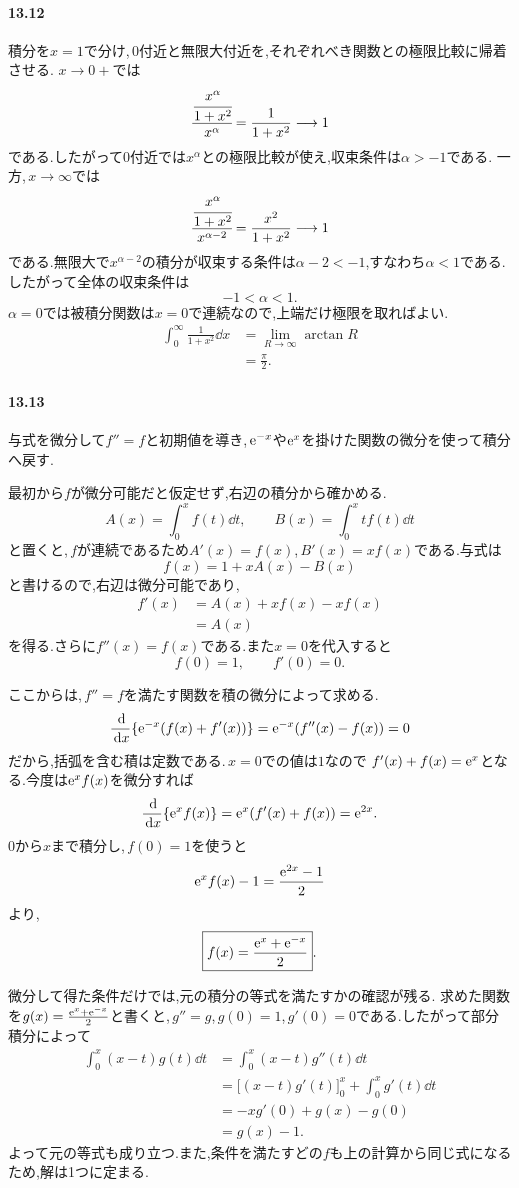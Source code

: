 \paragraph{13.12}
積分を$x=1$で分け,\,$0$付近と無限大付近を,それぞれべき関数との極限比較に帰着させる.
$x\to0+$では
\[
 \cfrac{\cfrac{x^\alpha}{1+x^2}}{x^\alpha}
 =\frac1{1+x^2}\longrightarrow1
\]
である.したがって$0$付近では$x^\alpha$との極限比較が使え,収束条件は$\alpha>-1$である.
一方,\,$x\to\infty$では
\[
 \cfrac{\cfrac{x^\alpha}{1+x^2}}{x^{\alpha-2}}
 =\frac{x^2}{1+x^2}\longrightarrow1
\]
である.無限大で$x^{\alpha-2}$の積分が収束する条件は$\alpha-2<-1$,すなわち$\alpha<1$である.
したがって全体の収束条件は
\[
 \boxed{-1<\alpha<1}.
\]
$\alpha=0$では被積分関数は$x=0$で連続なので,上端だけ極限を取ればよい.
\[
 \begin{aligned}
 \int_0^{\infty}\frac1{1+x^2}\dd x
 &=\lim_{R\to\infty}\arctan R\\
 &=\boxed{\frac{\pi}{2}}.
 \end{aligned}
\]

\paragraph{13.13}
与式を微分して$f''=f$と初期値を導き,\,$\mathrm{e}^{-x}$や$\mathrm{e}^x$を掛けた関数の微分を使って積分へ戻す.

最初から$f$が微分可能だと仮定せず,右辺の積分から確かめる.
\[
 A(x)=\int_0^xf(t)\dd t,\qquad
 B(x)=\int_0^xtf(t)\dd t
\]
と置くと,\,$f$が連続であるため$A'(x)=f(x)$,\,$B'(x)=xf(x)$である.与式は
\[
 f(x)=1+xA(x)-B(x)
\]
と書けるので,右辺は微分可能であり,
\[
 \begin{aligned}
 f'(x)&=A(x)+xf(x)-xf(x)\\
 &=A(x)
 \end{aligned}
\]
を得る.さらに$f''(x)=f(x)$である.また$x=0$を代入すると
\[
 f(0)=1,\qquad f'(0)=0.
\]

ここからは,\,$f''=f$を満たす関数を積の微分によって求める.
\[
 \frac{\,\mathrm{d}}{\,\mathrm{d} x}\{\mathrm{e}^{-x}(f(x)+f'(x))\}
 =\mathrm{e}^{-x}(f''(x)-f(x))=0
\]
だから,括弧を含む積は定数である.\,$x=0$での値は$1$なので
$f'(x)+f(x)=\mathrm{e}^x$となる.今度は$\mathrm{e}^xf(x)$を微分すれば
\[
 \frac{\,\mathrm{d}}{\,\mathrm{d} x}\{\mathrm{e}^xf(x)\}=\mathrm{e}^x(f'(x)+f(x))=\mathrm{e}^{2x}.
\]
$0$から$x$まで積分し,\,$f(0)=1$を使うと
\[
 \mathrm{e}^xf(x)-1=\frac{\mathrm{e}^{2x}-1}{2}
\]
より,
\[
 \boxed{f(x)=\frac{\mathrm{e}^x+\mathrm{e}^{-x}}2}.
\]

微分して得た条件だけでは,元の積分の等式を満たすかの確認が残る.
求めた関数を$g(x)=\frac{\mathrm{e}^x+\mathrm{e}^{-x}}2$と書くと,\,$g''=g$,\,$g(0)=1$,\,$g'(0)=0$である.したがって部分積分によって
\[
 \begin{aligned}
 \int_0^x(x-t)g(t)\dd t
 &=\int_0^x(x-t)g''(t)\dd t\\
 &=\bigl[(x-t)g'(t)\bigr]_0^x+\int_0^xg'(t)\dd t\\
 &=-xg'(0)+g(x)-g(0)\\
 &=g(x)-1.
 \end{aligned}
\]
よって元の等式も成り立つ.また,条件を満たすどの$f$も上の計算から同じ式になるため,解は1つに定まる.

